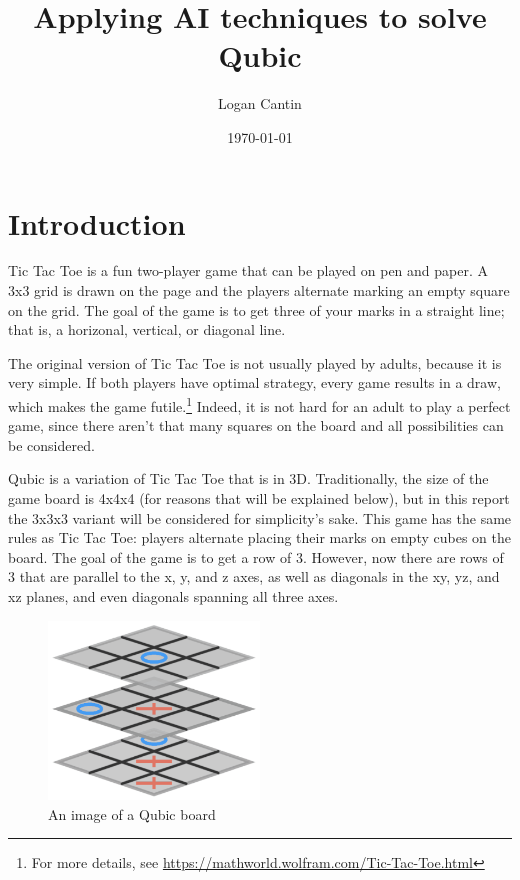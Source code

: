 \documentclass[11pt]{article}
\title{Applying AI techniques to solve Qubic}
\author{Logan Cantin}
\date{\today}
\begin{document}

\maketitle

\section{Introduction}

Tic Tac Toe is a fun two-player game that can be played on pen and paper. A 3x3 grid is drawn on the page and the players alternate marking an empty square on the grid. The goal of the game is to get three of your marks in a straight line; that is, a horizonal, vertical, or diagonal line.

The original version of Tic Tac Toe is not usually played by adults, because it is very simple. If both players have optimal strategy, every game results in a draw, which makes the game futile.\footnote{For more details, see \url{https://mathworld.wolfram.com/Tic-Tac-Toe.html}} Indeed, it is not hard for an adult to play a perfect game, since there aren't that many squares on the board and all possibilities can be considered.

Qubic is a variation of Tic Tac Toe that is in 3D. Traditionally, the size of the game board is 4x4x4 (for reasons that will be explained below), but in this report the 3x3x3 variant will be considered for simplicity's sake. This game has the same rules as Tic Tac Toe: players alternate placing their marks on empty cubes on the board. The goal of the game is to get a row of 3. However, now there are rows of 3 that are parallel to the x, y, and z axes, as well as diagonals in the xy, yz, and xz planes, and even diagonals spanning all three axes.

\begin{figure}[h]
    \centering
    \includegraphics[width=0.5\textwidth]{qubic}
    \caption[An image of a Qubic board]{An image of a Qubic board\footnotemark}
    \label{fig:qubic}
\end{figure}
\end{document}
